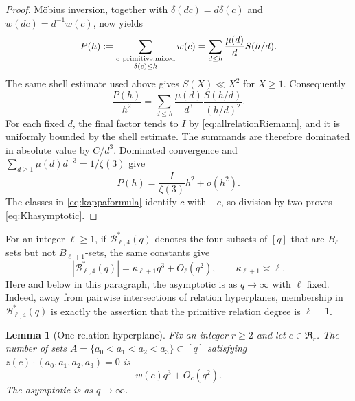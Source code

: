 \documentclass[11pt,reqno]{amsart}
\newtheorem{lemma}[theorem]{Lemma}
\theoremstyle{definition}
\theoremstyle{remark}
\begin{document}
\begin{proof}
M\"obius inversion, together with
$\delta(dc)=d\delta(c)$ and $w(dc)=d^{-1}w(c)$, now yields
\[
 P(h):=\sum_{\substack{c\ {\rm primitive, mixed}\\\delta(c)\leq h}}w(c)
 =\sum_{d\leq h}\frac{\mu(d)}d S(h/d).
\]
The same shell estimate used above gives $S(X)\ll X^2$ for $X\geq1$.
Consequently
\[
 \frac{P(h)}{h^2}
 =\sum_{d\leq h}\frac{\mu(d)}{d^3}
   \frac{S(h/d)}{(h/d)^2}.
\]
For each fixed $d$, the final factor tends to $I$ by
\eqref{eq:allrelationRiemann}, and it is uniformly bounded by the shell
estimate.  The summands are therefore dominated in absolute value by
$C/d^3$.  Dominated convergence and
$\sum_{d\geq1}\mu(d)d^{-3}=1/\zeta(3)$ give
\[
 P(h)=\frac{I}{\zeta(3)}h^2+o(h^2).
\]
The classes in \eqref{eq:kappaformula} identify $c$ with $-c$, so division
by two proves \eqref{eq:Khasymptotic}.
\end{proof}

For an integer $\ell\geq1$, if $\mathcal B^*_{\ell,4}(q)$ denotes the
four-subsets of $[q]$ that are
$B_\ell$-sets but not $B_{\ell+1}$-sets, the same constants give
\begin{equation}\label{eq:firstcollisionfrequency}
 |\mathcal B^*_{\ell,4}(q)|
 =\kappa_{\ell+1}q^3+O_\ell(q^2),
 \qquad \kappa_{\ell+1}\asymp\ell.
\end{equation}
Here and below in this paragraph, the asymptotic is as $q\to\infty$ with
$\ell$ fixed.
Indeed, away from pairwise intersections of relation hyperplanes,
membership in $\mathcal B^*_{\ell,4}(q)$ is exactly the assertion that the
primitive relation degree is $\ell+1$.

\begin{lemma}[One relation hyperplane]\label{lem:onehyperplane}
Fix an integer $r\geq2$ and let $c\in\mathfrak R_r$.  The number of sets
$A=\{a_0<a_1<a_2<a_3\}\subset[q]$ satisfying
$z(c)\cdot(a_0,a_1,a_2,a_3)=0$ is
\[
 w(c)q^3+O_c(q^2).
\]
The asymptotic is as $q\to\infty$.
\end{lemma}
\end{document}
